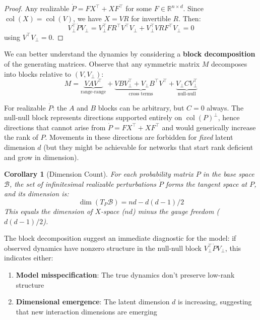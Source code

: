 \documentclass{article}
\newcommand{\RR}{\mathbb{R}}
\DeclareMathOperator{\col}{col}
\theoremstyle{plain}
\newtheorem{corollary}{Corollary}
\theoremstyle{definition}
\theoremstyle{remark}
\begin{document}
\begin{proof}
Any realizable $\dot{P} = FX^\top + XF^\top$ for some $F \in \RR^{n \times d}$.
Since $\col(X) = \col(V)$, we have $X = VR$ for invertible $R$.
Then:
\begin{equation}
V_\perp^\top \dot{P} V_\perp = V_\perp^\top F R^\top V^\top V_\perp + V_\perp^\top V R F^\top V_\perp = 0
\end{equation}
using $V^\top V_\perp = 0$.
\end{proof}

We can better understand the dynamics by considering a \textbf{block decomposition} of the generating matrices. Observe that any symmetric matrix $M$ decomposes into blocks relative to $(V, V_\perp)$:
\begin{equation}
M = \underbrace{VAV^\top}_{\text{range-range}} + \underbrace{VBV_\perp^\top + V_\perp B^\top V^\top}_{\text{cross terms}} + \underbrace{V_\perp C V_\perp^\top}_{\text{null-null}}
\end{equation}

For realizable $\dot{P}$: the $A$ and $B$ blocks can be arbitrary, but $C = 0$ always.
The null-null block represents directions supported entirely on $\col(P)^\perp$, hence directions that cannot arise from $\dot{P} = FX^\top + XF^\top$ and would generically increase the rank of $P$.
Movements in these directions are forbidden for \emph{fixed} latent dimension $d$ (but they might be achievable for networks that start rank deficient and grow in dimension).

\begin{corollary}[Dimension Count]
For each probability matrix $P$ in the base space $\mathcal{B}$, the set of infinitesimal realizable perturbations $\dot{P}$ forms the tangent space at $P$, and its dimension is:
\begin{equation}
\dim(T_P \mathcal{B}) = nd - d(d-1)/2
\end{equation}
This equals the dimension of $X$-space ($nd$) minus the gauge freedom ($d(d-1)/2$).
\end{corollary}

The block decomposition suggest an immediate diagnostic for the model: if observed dynamics have nonzero structure in the null-null block $V_\perp^\top \dot{P} V_\perp$, this indicates either:
\begin{enumerate}
\item \textbf{Model misspecification}: The true dynamics don't preserve low-rank structure
\item \textbf{Dimensional emergence}: The latent dimension $d$ is increasing, suggesting that new interaction dimensions are emerging
\end{enumerate}
\end{document}
